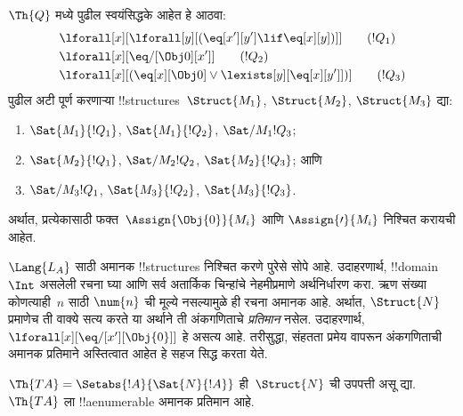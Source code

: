 \documentclass[../../../include/open-logic-section]{subfiles}
\begin{document}
\begin{prob}
$\Th{Q}$ मध्ये पुढील स्वयंसिद्धके आहेत हे आठवा:
\begin{align*}
& \lforall[x][\lforall[y][(\eq[x'][y'] \lif \eq[x][y])]] \tag{$!Q_1$}\\
& \lforall[x][\eq/[\Obj 0][x']] \tag{$!Q_2$}\\
& \lforall[x][(\eq[x][\Obj 0] \lor \lexists[y][\eq[x][y']])] \tag{$!Q_3$}
\end{align*}
पुढील अटी पूर्ण करणाऱ्या !!{structure}s~$\Struct{M_1}$, $\Struct{M_2}$,
$\Struct{M_3}$ द्या:
\begin{enumerate}
\item $\Sat{M_1}{!Q_1}$, $\Sat{M_1}{!Q_2}$, $\Sat/{M_1}{!Q_3}$;
\item $\Sat{M_2}{!Q_1}$, $\Sat/{M_2}{!Q_2}$, $\Sat{M_2}{!Q_3}$; आणि
\item $\Sat/{M_3}{!Q_1}$, $\Sat{M_3}{!Q_2}$, $\Sat{M_3}{!Q_3}$.
\end{enumerate}
अर्थात, प्रत्येकासाठी फक्त~$\Assign{\Obj{0}}{M_i}$ आणि
$\Assign{\prime}{M_i}$ निश्चित करायची आहेत.
\end{prob}

\begin{explain}
$\Lang{L_A}$ साठी अमानक !!{structure}s निश्चित करणे पुरेसे सोपे आहे.
उदाहरणार्थ, !!{domain}~$\Int$ असलेली रचना घ्या आणि सर्व अतार्किक चिन्हांचे
नेहमीप्रमाणे अर्थनिर्धारण करा. ऋण संख्या कोणत्याही~$n$ साठी $\num{n}$ ची
मूल्ये नसल्यामुळे ही रचना अमानक आहे. अर्थात, $\Struct{N}$ प्रमाणेच ती
वाक्ये सत्य करते या अर्थाने ती अंकगणिताचे \emph{प्रतिमान} नसेल. उदाहरणार्थ,
$\lforall[x][\eq/[x'][\Obj{0}]]$ हे असत्य आहे. तरीसुद्धा, संहतता प्रमेय
वापरून अंकगणिताची अमानक प्रतिमाने अस्तित्वात आहेत हे सहज सिद्ध करता येते.
\end{explain}

\begin{prop}
$\Th{TA} = \Setabs{!A}{\Sat{N}{!A}}$ ही~$\Struct{N}$ ची उपपत्ती असू द्या.
$\Th{TA}$ ला !!a{enumerable} अमानक प्रतिमान आहे.
\end{prop}
\end{document}
